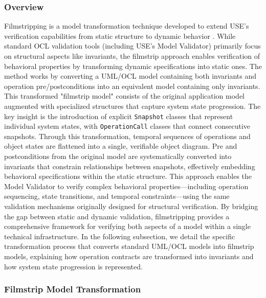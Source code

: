 \subsubsection{Overview}
\hspace{1cm} Filmstripping is a model transformation technique developed to extend USE's 
verification capabilities from static structure to dynamic behavior \cite{AM2Filmstrip} \cite{Filmstripping}. 
While standard OCL validation tools (including USE's Model Validator) primarily 
focus on structural aspects like invariants, the filmstrip approach enables 
verification of behavioral properties by transforming dynamic specifications into 
static ones. The method works by converting a UML/OCL model containing both invariants 
and operation pre/postconditions into an equivalent model containing only invariants. 
This transformed "filmstrip model" consists of the original application model 
augmented with specialized structures that capture system state progression. The 
key insight is the introduction of explicit \texttt{Snapshot} classes that represent 
individual system states, with \texttt{OperationCall} classes that connect 
consecutive snapshots. Through this transformation, temporal sequences of operations 
and object states are flattened into a single, verifiable object diagram. Pre and 
postconditions from the original model are systematically converted into invariants 
that constrain relationships between snapshots, effectively embedding behavioral 
specifications within the static structure. This approach enables the Model Validator 
to verify complex behavioral properties—including operation sequencing, state 
transitions, and temporal constraints—using the same validation mechanisms originally 
designed for structural verification. By bridging the gap between static and dynamic 
validation, filmstripping provides a comprehensive framework for verifying both 
aspects of a model within a single technical infrastructure. In the following 
subsection, we detail the specific transformation process that converts standard 
UML/OCL models into filmstrip models, explaining how operation contracts are 
transformed into invariants and how system state progression is represented.

\subsubsection{Filmstrip Model Transformation}

